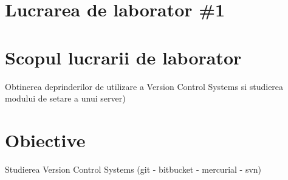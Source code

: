 \section*{Lucrarea de laborator \#1}

\section{Scopul lucrarii de laborator}
Obtinerea deprinderilor de utilizare a Version Control Systems si studierea modului de setare a unui server)
\section{Obiective}

Studierea Version Control Systems (git - bitbucket - mercurial - svn)

\clearpage